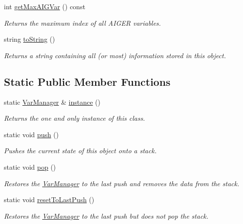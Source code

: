 \begin{DoxyCompactItemize}
int \hyperlink{classVarManager_a95f50cca9e5612c4a8cc644fc8d67788}{get\-Max\-A\-I\-G\-Var} () const 
\begin{DoxyCompactList}\small\item\em Returns the maximum index of all A\-I\-G\-E\-R variables. \end{DoxyCompactList}\item 
string \hyperlink{classVarManager_aca1c867d5be7a7f38b6884dbd399419e}{to\-String} ()
\begin{DoxyCompactList}\small\item\em Returns a string containing all (or most) information stored in this object. \end{DoxyCompactList}\end{DoxyCompactItemize}
\subsection*{Static Public Member Functions}
\begin{DoxyCompactItemize}
\item 
static \hyperlink{classVarManager}{Var\-Manager} \& \hyperlink{classVarManager_ac1a84b367c26dfc5ee9e612f7d61b288}{instance} ()
\begin{DoxyCompactList}\small\item\em Returns the one and only instance of this class. \end{DoxyCompactList}\item 
static void \hyperlink{classVarManager_a8ca6373bb644693c2995e6473b47566f}{push} ()
\begin{DoxyCompactList}\small\item\em Pushes the current state of this object onto a stack. \end{DoxyCompactList}\item 
static void \hyperlink{classVarManager_a6f2350621a62b97ca06d3469dc9d65f1}{pop} ()
\begin{DoxyCompactList}\small\item\em Restores the \hyperlink{classVarManager}{Var\-Manager} to the last push and removes the data from the stack. \end{DoxyCompactList}\item 
static void \hyperlink{classVarManager_a127668367698d32229f58a7ecb9c2ba2}{reset\-To\-Last\-Push} ()
\begin{DoxyCompactList}\small\item\em Restores the \hyperlink{classVarManager}{Var\-Manager} to the last push but does not pop the stack. \end{DoxyCompactList}\end{DoxyCompactItemize}
